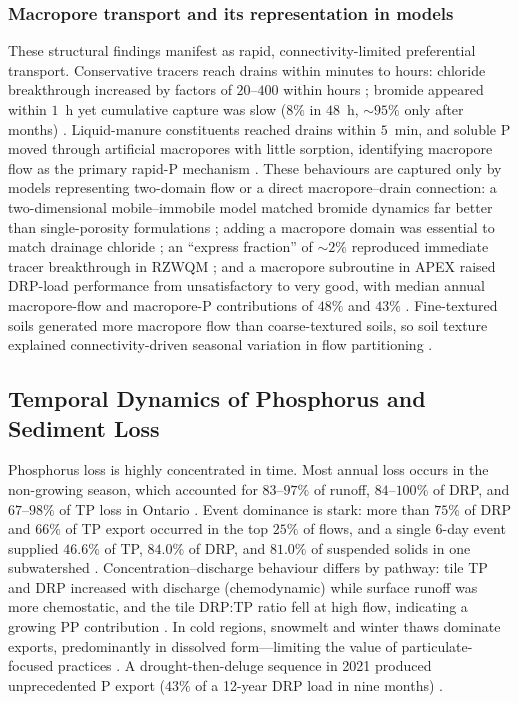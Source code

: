 \subsubsection{Macropore transport and its representation in models}

These structural findings manifest as rapid, connectivity-limited
preferential transport. Conservative tracers reach drains within minutes to
hours: chloride breakthrough increased by factors of $20$--$400$ within hours
\parencite{Villholth1998}; bromide appeared within $1$~h yet cumulative
capture was slow ($8\%$ in $48$~h, $\sim95\%$ only after months)
\parencite{Frey2012,Kladivko2023}. Liquid-manure constituents reached drains
within $5$~min, and soluble P moved through artificial macropores with little
sorption, identifying macropore flow as the primary rapid-P mechanism
\parencite{Stamm2002,Geohring2001}. These behaviours are captured only by
models representing two-domain flow or a direct macropore--drain connection:
a two-dimensional mobile--immobile model matched bromide dynamics far better
than single-porosity formulations \parencite{Köhne2006}; adding a macropore
domain was essential to match drainage chloride \parencite{Villholth1998b};
an ``express fraction'' of $\sim2\%$ reproduced immediate tracer breakthrough
in RZWQM \parencite{Fox2004,Fox2007b}; and a macropore subroutine in APEX
raised DRP-load performance from unsatisfactory to very good, with median
annual macropore-flow and macropore-P contributions of $48\%$ and $43\%$
\parencite{Ford2017}. Fine-textured soils generated more macropore flow than
coarse-textured soils, so soil texture explained connectivity-driven seasonal
variation in flow partitioning \parencite{Poon2021,Holbak2021}.

\subsection{Temporal Dynamics of Phosphorus and Sediment Loss}

Phosphorus loss is highly concentrated in time. Most annual loss occurs in
the non-growing season, which accounted for $83$--$97\%$ of runoff,
$84$--$100\%$ of DRP, and $67$--$98\%$ of TP loss in Ontario
\parencite{VanEsbroeck2016,Qi2018}. Event dominance is stark: more than
$75\%$ of DRP and $66\%$ of TP export occurred in the top $25\%$ of flows,
and a single 6-day event supplied $46.6\%$ of TP, $84.0\%$ of DRP, and
$81.0\%$ of suspended solids in one subwatershed \parencite{Brendel2019}.
Concentration--discharge behaviour differs by pathway: tile TP and DRP
increased with discharge (chemodynamic) while surface runoff was more
chemostatic, and the tile DRP:TP ratio fell at high flow, indicating a
growing PP contribution \parencite{Osterholz2020}. In cold regions, snowmelt
and winter thaws dominate exports, predominantly in dissolved form---limiting
the value of particulate-focused practices \parencite{Baulch2019,Clement2017}.
A drought-then-deluge sequence in 2021 produced unprecedented P export
($43\%$ of a 12-year DRP load in nine months) \parencite{Millar2025,Mumbi2025b}.


